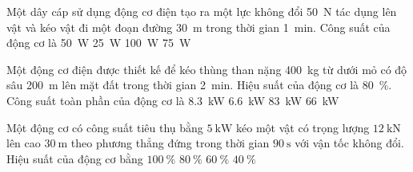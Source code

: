 \begin{ex}
	Một dây cáp sử dụng động cơ điện tạo ra một lực không đổi \SI{50}{\newton} tác dụng lên vật và kéo vật đi một đoạn đường \SI{30}{\meter} trong thời gian \SI{1}{\minute}. Công suất của động cơ là
	\choice
	{\SI{50}{\watt}}
	{\True \SI{25}{\watt}}
	{\SI{100}{\watt}}
	{\SI{75}{\watt}}
	\loigiai{}
\end{ex}
\begin{ex}
	Một động cơ điện được thiết kế để kéo thùng than nặng \SI{400}{\kilogram} từ dưới mỏ có độ sâu \SI{200}{\meter} lên mặt đất trong thời gian \SI{2}{\minute}. Hiệu suất của động cơ là \SI{80}{\percent}. Công suất toàn phần của động cơ là
	\choice
	{\True \SI{8.3}{\kilo\watt}}
	{\SI{6.6}{\kilo\watt}}
	{\SI{83}{\kilo\watt}}
	{\SI{66}{\kilo\watt}}
	\loigiai{}
\end{ex}
\begin{ex}
	Một động cơ có công suất tiêu thụ bằng $\SI{5}{\kilo\watt}$ kéo một vật có trọng lượng $\SI{12}{\kilo\newton}$ lên cao $\SI{30}{\meter}$ theo phương thẳng đứng trong thời gian $\SI{90}{\second}$ với vận tốc không đổi. Hiệu suất của động cơ bằng
	\choice
	{$\SI{100}{\percent}$}
	{\True $\SI{80}{\percent}$}
	{$\SI{60}{\percent}$}
	{$\SI{40}{\percent}$}
\end{ex}
